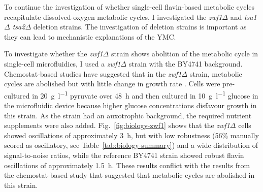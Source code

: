 To continue the investigation of whether single-cell flavin-based metabolic cycles recapitulate dissolved-oxygen metabolic cycles, I investigated the \textit{zwf1$\Delta$} and \textit{tsa1$\Delta$ tsa2$\Delta$} deletion strains.
The investigation of deletion strains is important as they can lead to mechanistic explanations of the YMC\@.

To investigate whether the \textit{zwf1$\Delta$} strain shows abolition of the metabolic cycle in single-cell microfluidics, I used a \textit{zwf1$\Delta$} strain with the BY4741 background.
Chemostat-based studies have suggested that in the \textit{zwf1$\Delta$} strain, metabolic cycles are abolished but with little change in growth rate \parencite{tuCyclicChangesMetabolic2007}.
Cells were pre-cultured in \SI{20}{\gram~\litre^{-1}} pyruvate over \SI{48}{\hour} and then cultured in \SI{10}{\gram~\litre^{-1}} glucose in the microfluidic device because higher glucose concentrations disfavour growth in this strain.
As the strain had an auxotrophic background, the required nutrient supplements were also added.
%
Fig.\ \ref{fig:biology-zwf1} shows that the \textit{zwf1$\Delta$} cells showed oscillations of approximately \SI{3}{\hour}, but with low robustness (56\% manually scored as oscillatory, see Table~\ref{tab:biology-summary}) and a wide distribution of signal-to-noise ratios, while the reference BY4741 strain showed robust flavin oscillations of approximately \SI{1.5}{\hour}.
These results conflict with the results from the chemostat-based study \parencite{tuCyclicChangesMetabolic2007} that suggested that metabolic cycles are abolished in this strain.

